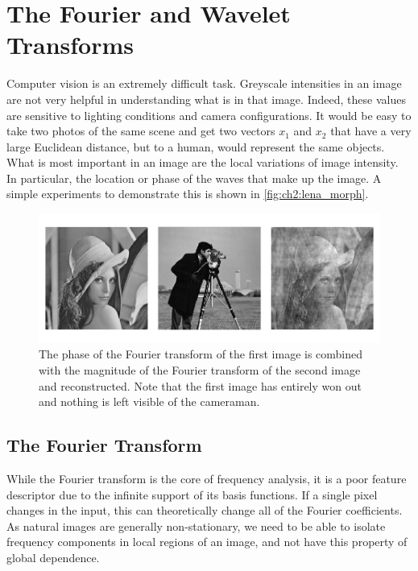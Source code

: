\section{The Fourier and Wavelet Transforms}

  Computer vision is an extremely difficult task. Greyscale intensities in an image are
  not very helpful in understanding what is in that image. Indeed, these values are
  sensitive to lighting conditions and camera configurations. It would be easy to
  take two photos of the same scene and get two vectors $x_1$ and $x_2$ that have
  a very large Euclidean distance, but to a human, would represent the same
  objects. What is most important in an image are the local variations
  of image intensity. In particular, the location or phase of the waves that make
  up the image. A simple experiments to demonstrate this is shown in 
  \autoref{fig:ch2:lena_morph}. 

  \begin{figure}
    \centering
      \includegraphics[width=1.1\textwidth]{litreview/images/lena_mag_swap.png}
        {The phase of the Fourier transform of the first image is combined 
         with the magnitude of the Fourier
         transform of the second image and reconstructed. Note that the
         first image has entirely won out and nothing is left visible of
         the cameraman.}
      \label{fig:ch2:lena_morph}
  \end{figure}

\subsection{The Fourier Transform}
  While the Fourier transform is the core of frequency analysis, it is a poor
  feature descriptor due to the infinite support of its basis functions. If
  a single pixel changes in the input, this can theoretically change all of the
  Fourier coefficients. As natural images are generally non-stationary, we need
  to be able to isolate frequency components in local regions of an image, and
  not have this property of global dependence.

